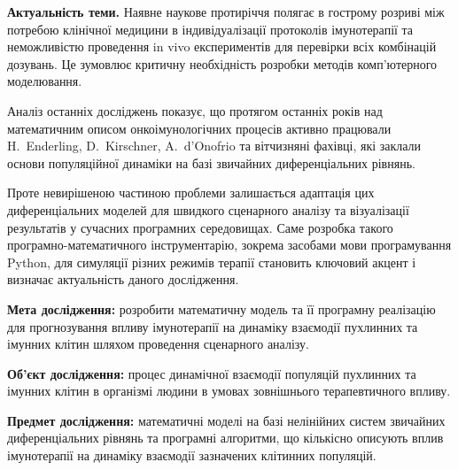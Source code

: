 \documentclass[14pt, a4paper]{extarticle}
\begin{document}
	
	\textbf{Актуальність теми.}
	Наявне наукове протиріччя полягає в гострому розриві між потребою клінічної медицини в індивідуалізації протоколів імунотерапії та неможливістю проведення in vivo експериментів для перевірки всіх комбінацій дозувань. Це зумовлює критичну необхідність розробки методів комп'ютерного моделювання.
	
	Аналіз останніх досліджень показує, що протягом останніх років над математичним описом онкоімунологічних процесів активно працювали H.~Enderling, D.~Kirschner, A.~d'Onofrio та вітчизняні фахівці, які заклали основи популяційної динаміки на базі звичайних диференціальних рівнянь.
	
	Проте невирішеною частиною проблеми залишається адаптація цих диференціальних моделей для швидкого сценарного аналізу та візуалізації результатів у сучасних програмних середовищах. Саме розробка такого програмно-математичного інструментарію, зокрема засобами мови програмування Python, для симуляції різних режимів терапії становить ключовий акцент і визначає актуальність даного дослідження.
	
	\textbf{Мета дослідження:} розробити математичну модель та її програмну реалізацію для прогнозування впливу імунотерапії на динаміку взаємодії пухлинних та імунних клітин шляхом проведення сценарного аналізу.
	
	\textbf{Об'єкт дослідження:} процес динамічної взаємодії популяцій пухлинних та імунних клітин в організмі людини в умовах зовнішнього терапевтичного впливу.
	
	\textbf{Предмет дослідження:} математичні моделі на базі нелінійних систем звичайних диференціальних рівнянь та програмні алгоритми, що кількісно описують вплив імунотерапії на динаміку взаємодії зазначених клітинних популяцій.
	
	\newpage
	
	
\end{document}
